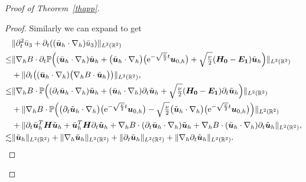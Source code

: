 \documentclass[pdflatex,sn-mathphys-num]{sn-jnl}%
\theoremstyle{thmstyleone}%
\theoremstyle{thmstyletwo}%
\theoremstyle{thmstylethree}%
\theoremstyle{thmstyletwo}
\begin{document}
\begin{proof}[Proof of Theorem~{\upshape\ref{thapp}}]
\begin{proof}
	Similarly we can expand to get
	\begin{align}\label{n15}
	&\lVert
	\partial^2_t \bar{u}_3+	\partial_t((\bar{\boldsymbol{u}}_h\cdot\nabla_h)\bar{u}_3)\rVert_{{L}^{2}(\mathbb{R}^2)}\notag\\
	\leq&\lVert\nabla_{h}B\cdot
		\partial_t\mathbb{P}\Big(	(\bar {\boldsymbol u}_h \cdot \nabla_h) \tilde{\boldsymbol{u}}_h+\big(\tilde{\boldsymbol{u}}_h\cdot  \nabla_h\big)\big(\mathrm{e}^{-\sqrt{\frac\nu2}t}{\boldsymbol{u}}_{0,h}\big)+\sqrt{\tfrac{\nu}{2}}
	(\boldsymbol{H_0}
	-\boldsymbol{E_1})\tilde{\boldsymbol{u}}_h
	\Big)\rVert_{{L}^{2}(\mathbb{R}^2)}\notag\\
	&+\lVert	\partial_t\big((\bar{\boldsymbol{u}}_h\cdot\nabla_h)\big(\nabla_{ h}B\cdot\tilde{\boldsymbol{u}}_h\big)\big)\rVert_{{L}^{2}(\mathbb{R}^2)},\notag\\
	\leq&
	\lVert\nabla_{h}B\cdot
	 \mathbb{P}\Big(	
	(\partial_t\bar {\boldsymbol u}_h \cdot \nabla_h) \tilde{\boldsymbol{u}}_h
	+(\bar {\boldsymbol u}_h \cdot \nabla_h) \partial_t\tilde{\boldsymbol{u}}_h
	+\sqrt{\tfrac{\nu}{2}}
	(\boldsymbol{H_0}
	-\boldsymbol{E_1})\partial_t\tilde{\boldsymbol{u}}_h
	\Big)\rVert_{{L}^{2}(\mathbb{R}^2)}\notag\\
		&+
	\lVert\nabla_{h}B\cdot
	\mathbb{P}\Big(	
	\big(\partial_t\tilde{\boldsymbol{u}}_h\cdot  \nabla_h\big)\big(\mathrm{e}^{-\sqrt{\frac\nu2}t}{\boldsymbol{u}}_{0,h}\big)
	-\sqrt{\tfrac\nu2}
	\big(\tilde{\boldsymbol{u}}_h\cdot  \nabla_h\big)\big(\mathrm{e}^{-\sqrt{\frac\nu2}t}{\boldsymbol{u}}_{0,h}\big)
	\Big)\rVert_{{L}^{2}(\mathbb{R}^2)}\notag\\
	&+
	\lVert	\partial_t \bar{\boldsymbol{u}}^T_h\boldsymbol{H}\tilde{\boldsymbol{u}}_h
	+ \bar{\boldsymbol{u}}^T_h\boldsymbol{H}\partial_t\tilde{\boldsymbol{u}}_h
	+
	\nabla_h B\cdot (\partial_t\bar{\boldsymbol{u}}_h\cdot\nabla_h)\tilde{\boldsymbol{u}}_h+
	\nabla_h B\cdot (\bar{\boldsymbol{u}}_h\cdot\nabla_h)\partial_t\tilde{\boldsymbol{u}}_h
	\rVert_{{L}^{2}(\mathbb{R}^2)},\notag\\
	\lesssim&
	\lVert
	\tilde{\boldsymbol{u}}_h
	\rVert_{{L}^{2}(\mathbb{R}^2)}
	+
	\lVert\nabla_{ h}
	\tilde{\boldsymbol{u}}_h
	\rVert_{{L}^{2}(\mathbb{R}^2)}
	+\lVert
	\partial_t\tilde{\boldsymbol{u}}_h
	\rVert_{{L}^{2}(\mathbb{R}^2)}
	+
	\lVert\nabla_{ h}
	\partial_t\tilde{\boldsymbol{u}}_h
	\rVert_{{L}^{2}(\mathbb{R}^2)}.
\end{align}	
	
	
	

\end{proof}
\end{proof}
\end{document}
